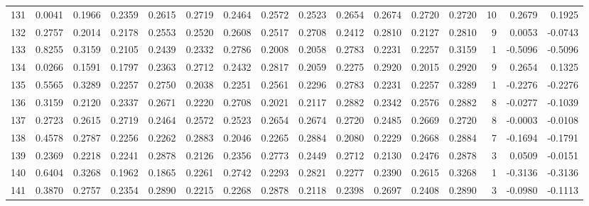 \begin{tabular}{lrrrrrrrrrrrrrrr}
131 &      0.0041 &  0.1966 &  0.2359 &  0.2615 &  0.2719 &  0.2464 &  0.2572 &  0.2523 &  0.2654 &  0.2674 &   0.2720 &     0.2720 &     10 &                    0.2679 &                     0.1925 \\
132 &      0.2757 &  0.2014 &  0.2178 &  0.2553 &  0.2520 &  0.2608 &  0.2517 &  0.2708 &  0.2412 &  0.2810 &   0.2127 &     0.2810 &      9 &                    0.0053 &                    -0.0743 \\
133 &      0.8255 &  0.3159 &  0.2105 &  0.2439 &  0.2332 &  0.2786 &  0.2008 &  0.2058 &  0.2783 &  0.2231 &   0.2257 &     0.3159 &      1 &                   -0.5096 &                    -0.5096 \\
134 &      0.0266 &  0.1591 &  0.1797 &  0.2363 &  0.2712 &  0.2432 &  0.2817 &  0.2059 &  0.2275 &  0.2920 &   0.2015 &     0.2920 &      9 &                    0.2654 &                     0.1325 \\
135 &      0.5565 &  0.3289 &  0.2257 &  0.2750 &  0.2038 &  0.2251 &  0.2561 &  0.2296 &  0.2783 &  0.2231 &   0.2257 &     0.3289 &      1 &                   -0.2276 &                    -0.2276 \\
136 &      0.3159 &  0.2120 &  0.2337 &  0.2671 &  0.2220 &  0.2708 &  0.2021 &  0.2117 &  0.2882 &  0.2342 &   0.2576 &     0.2882 &      8 &                   -0.0277 &                    -0.1039 \\
137 &      0.2723 &  0.2615 &  0.2719 &  0.2464 &  0.2572 &  0.2523 &  0.2654 &  0.2674 &  0.2720 &  0.2485 &   0.2669 &     0.2720 &      8 &                   -0.0003 &                    -0.0108 \\
138 &      0.4578 &  0.2787 &  0.2256 &  0.2262 &  0.2883 &  0.2046 &  0.2265 &  0.2884 &  0.2080 &  0.2229 &   0.2668 &     0.2884 &      7 &                   -0.1694 &                    -0.1791 \\
139 &      0.2369 &  0.2218 &  0.2241 &  0.2878 &  0.2126 &  0.2356 &  0.2773 &  0.2449 &  0.2712 &  0.2130 &   0.2476 &     0.2878 &      3 &                    0.0509 &                    -0.0151 \\
140 &      0.6404 &  0.3268 &  0.1962 &  0.1865 &  0.2261 &  0.2742 &  0.2293 &  0.2821 &  0.2277 &  0.2390 &   0.2615 &     0.3268 &      1 &                   -0.3136 &                    -0.3136 \\
141 &      0.3870 &  0.2757 &  0.2354 &  0.2890 &  0.2215 &  0.2268 &  0.2878 &  0.2118 &  0.2398 &  0.2697 &   0.2408 &     0.2890 &      3 &                   -0.0980 &                    -0.1113 \\

\end{tabular}

